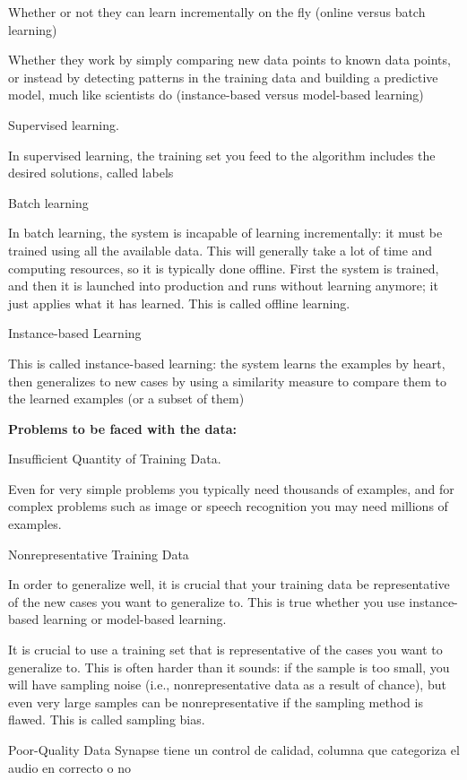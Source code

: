 \documentclass[12pt, a4paper]{article}
\begin{document}
	 Whether or not they can learn incrementally on the fly (online versus batch learning)
	 
	 Whether they work by simply comparing new data points to known data points, or instead by detecting patterns in the training data and building a predictive model, much like scientists do (instance-based versus model-based learning)
	 
	 Supervised learning.
	 
	 In supervised learning, the training set you feed to the algorithm includes the desired solutions, called labels
	 
	 Batch learning
	 
	 In batch learning, the system is incapable of learning incrementally: it must be trained using all the available data. This will generally take a lot of time and computing resources, so it is typically done offline. First the system is trained, and then it is launched into production and runs without learning anymore; it just applies what it has learned. This is called offline learning.
	 
	 Instance-based Learning
	 
	 This is called instance-based learning: the system learns the examples by heart, then generalizes to new cases by using a similarity measure to compare them to the learned examples (or a subset of them)
	 
	 \textbf{Problems to be faced with the data:}
	 
	 Insufficient Quantity of Training Data.
	 
	 Even for very simple problems you typically need thousands of examples, and for complex problems such as image or speech recognition you may need millions of examples.
	 
	 Nonrepresentative Training Data
	 
	 In order to generalize well, it is crucial that your training data be representative of the new cases you want to generalize to. This is true whether you use instance-based learning or model-based learning.
	 
	 It is crucial to use a training set that is representative of the cases you want to generalize to. This is often harder than it sounds: if the sample is too small, you will have sampling noise (i.e., nonrepresentative data as a result of chance), but even very large samples can be nonrepresentative if the sampling method is flawed. This is called sampling bias.
	 
	 Poor-Quality Data %
	 Synapse tiene un control de calidad, columna que categoriza el audio en correcto o no 
	 
\end{document}
